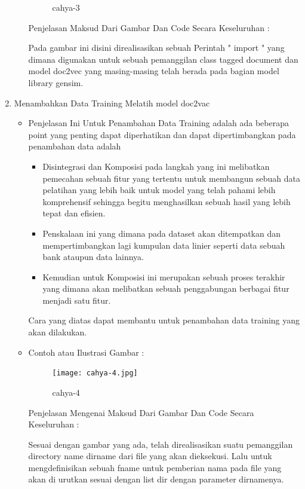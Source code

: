 \begin{enumerate}
\begin{itemize}
\begin{figure}[!hbtp]
\caption{cahya-3}
\label{cahya-3}
\end{figure}
\par
\par Penjelasan  Maksud Dari Gambar Dan Code Secara Keseluruhan  : 
\par Pada gambar ini disini direalisasikan sebuah Perintah " import " yang dimana digunakan untuk sebuah pemanggilan class tagged document dan model doc2vec yang masing-masing telah  berada pada bagian model library gensim.
\par
\end{itemize}
\item Menambahkan Data Training  Melatih model doc2vac 
\begin{itemize}
\item Penjelasan Ini Untuk Penambahan Data Training adalah  ada beberapa point yang  penting dapat diperhatikan dan dapat dipertimbangkan pada penambahan data adalah
\begin{itemize}
\item Disintegrasi dan Komposisi pada  langkah yang ini melibatkan pemecahan sebuah fitur yang tertentu untuk membangun sebuah data pelatihan yang lebih baik untuk model yang telah pahami lebih komprehensif sehingga begitu menghasilkan sebuah hasil yang lebih tepat dan efisien.
\item Penskalaan ini yang dimana pada dataset akan ditempatkan dan mempertimbangkan lagi kumpulan data linier seperti data sebuah bank ataupun data lainnya.
\item Kemudian untuk Komposisi ini  merupakan sebuah proses terakhir yang dimana akan melibatkan sebuah penggabungan berbagai fitur menjadi satu fitur.
\par
\end{itemize}
\par Cara yang  diatas dapat membantu untuk penambahan data training yang akan dilakukan.
\par
\par
\item Contoh atau Ilustrasi Gambar :
\par
\begin{figure}[!hbtp]
\centering
\texttt{[image: cahya-4.jpg]}
\caption{cahya-4}
\label{cahya-4}
\end{figure}
\par
\par Penjelasan Mengenai  Maksud Dari Gambar Dan Code Secara Keseluruhan  : 
\par Sesuai dengan gambar yang ada, telah direalisasikan suatu pemanggilan directory name dirname dari file yang akan dieksekusi. Lalu untuk mengdefinisikan sebuah fname untuk pemberian nama pada file  yang akan di urutkan sesuai dengan list dir dengan parameter dirnamenya.

\end{itemize}
\end{enumerate}

